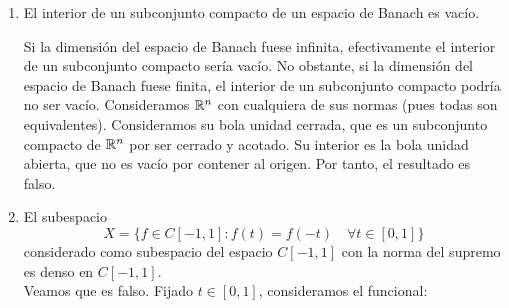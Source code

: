 \documentclass[12pt]{article}
\begin{document}
\begin{ejercicio}
\begin{enumerate}
\begin{itemize}
                \item Para ver que no es abierto, consideremos el polinomio $p_0(t) = 0$ para todo $t\in [0,1]$. Fijado $\varepsilon > 0$, consideremos la función:

                Claramente, $g_\varepsilon\in C[0,1]$ y:
                \begin{equation*}
                    \|g_\varepsilon - p_0\| = \sup_{t\in [0,1]} |g_\varepsilon(t) - p_0(t)| = \sup_{t\in [0,1]} |g_\varepsilon(t)| = \sup_{t\in [0,1]} \veps\cdot \left|t-\frac{1}{2}\right| = \frac{\veps}{2} < \varepsilon
                \end{equation*}

                Por tanto, $g_\varepsilon\in B(p_0,\varepsilon)$. No obstante, $g_\varepsilon$ no es un polinomio pues no es diferenciable en $t = \nicefrac{1}{2}$. Por tanto, para todo $\varepsilon > 0$, existe $g_\varepsilon\in B(p_0,\varepsilon)$ tal que $g_\varepsilon$ no es un polinomio. Por tanto, el conjunto de todos los polinomios con coeficientes reales no es abierto.
            \end{itemize}
            \item El interior de un subconjunto compacto de un espacio de Banach es vacío.
            
            Si la dimensión del espacio de Banach fuese infinita, efectivamente el interior de un subconjunto compacto sería vacío. No obstante, si la dimensión del espacio de Banach fuese finita, el interior de un subconjunto compacto podría no ser vacío. Consideramos $\mathbb{R}^n$ con cualquiera de sus normas (pues todas son equivalentes). Consideramos su bola unidad cerrada, que es un subconjunto compacto de $\mathbb{R}^n$ por ser cerrado y acotado. Su interior es la bola unidad abierta, que no es vacío por contener al origen. Por tanto, el resultado es falso.
            \item El subespacio
                \begin{equation*}
                    X = \{f\in C[-1,1] : f(t) = f(-t) \quad \forall t\in [0,1]\}
                \end{equation*}
                considerado como subespacio del espacio $C[-1,1]$ con la norma del supremo es denso en $C[-1,1]$.\\

                Veamos que es falso. Fijado $t\in [0,1]$, consideramos el funcional:


\end{enumerate}
\end{ejercicio}
\end{document}
